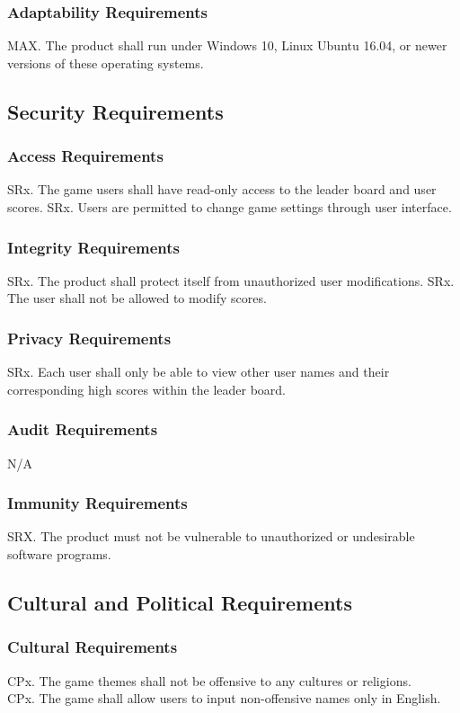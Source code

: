\documentclass{article}
\begin{document}
    \subsubsection{Adaptability Requirements}
    MAX. The product shall run under Windows 10, Linux Ubuntu 16.04, or newer versions of these operating systems.
    
\subsection{Security Requirements}
    \subsubsection{Access Requirements}
    SRx. The game users shall have read-only access to the leader board and user scores.
    SRx. Users are permitted to change game settings through user interface.
    
    \subsubsection{Integrity Requirements}
    SRx. The product shall protect itself from unauthorized user modifications.
    SRx. The user shall not be allowed to modify scores.
    
    \subsubsection{Privacy Requirements}
    SRx. Each user shall only be able to view other user names and their corresponding high scores within the leader board.
    
    \subsubsection{Audit Requirements}
    N/A
    
    \subsubsection{Immunity Requirements}
    SRX. The product must not be vulnerable to unauthorized or undesirable software programs.
    
\subsection{Cultural and Political Requirements}
    \subsubsection{Cultural Requirements}
    CPx. The game themes shall not be offensive to any cultures or religions. \\
    CPx. The game shall allow users to input non-offensive names only in English.
\end{document}
